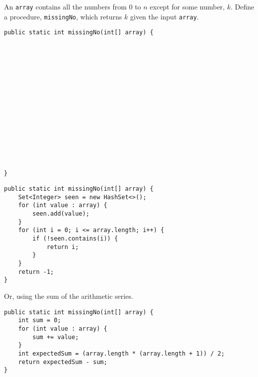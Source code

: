 \question An \texttt{array} contains all the numbers from $0$ to $n$ except for some number, $k$. Define a procedure, \texttt{missingNo}, which returns $k$ given the input \texttt{array}.

\ifprintanswers\else
\begin{lstlisting}
public static int missingNo(int[] array) {
















}
\end{lstlisting}
\fi

\begin{solution}
\begin{lstlisting}
public static int missingNo(int[] array) {
    Set<Integer> seen = new HashSet<>();
    for (int value : array) {
        seen.add(value);
    }
    for (int i = 0; i <= array.length; i++) {
        if (!seen.contains(i)) {
            return i;
        }
    }
    return -1;
}
\end{lstlisting}

Or, using the sum of the arithmetic series.

\begin{lstlisting}
public static int missingNo(int[] array) {
    int sum = 0;
    for (int value : array) {
        sum += value;
    }
    int expectedSum = (array.length * (array.length + 1)) / 2;
    return expectedSum - sum;
}
\end{lstlisting}
\end{solution}